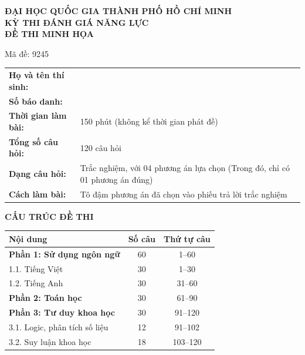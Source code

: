 \documentclass[12pt,a4paper]{article}
\begin{document}
\sloppy

\begin{center}
{\bfseries ĐẠI HỌC QUỐC GIA THÀNH PHỐ HỒ CHÍ MINH}\\[0.1cm]
{\bfseries KỲ THI ĐÁNH GIÁ NĂNG LỰC}\\[0.1cm]
{\bfseries ĐỀ THI MINH HỌA}
\end{center}
\hfill{\small Mã đề: 9245}

\noindent\begin{tabular}{@{}p{}p{}@{}}
\textbf{Họ và tên thí sinh:} & \dotfill \\
\textbf{Số báo danh:} & \dotfill \\
\textbf{Thời gian làm bài:} & 150 phút (không kể thời gian phát đề) \\
\textbf{Tổng số câu hỏi:} & 120 câu hỏi \\
\textbf{Dạng câu hỏi:} & Trắc nghiệm, với 04 phương án lựa chọn (Trong đó, chỉ có 01 phương án đúng) \\
\textbf{Cách làm bài:} & Tô đậm phương án đã chọn vào phiếu trả lời trắc nghiệm \\
\end{tabular}

\begin{center}\textbf{CẤU TRÚC ĐỀ THI}\\[0.1cm]
\begin{tabular}{|p{}|c|c|}\hline
\textbf{Nội dung} & \textbf{Số câu} & \textbf{Thứ tự câu} \\ \hline
\textbf{Phần 1: Sử dụng ngôn ngữ} & 60 & 1–60 \\ \hline
\hspace{0.5cm}1.1. Tiếng Việt & 30 & 1–30 \\ \hline
\hspace{0.5cm}1.2. Tiếng Anh & 30 & 31–60 \\ \hline
\textbf{Phần 2: Toán học} & 30 & 61–90 \\ \hline
\textbf{Phần 3: Tư duy khoa học} & 30 & 91–120 \\ \hline
\hspace{0.5cm}3.1. Logic, phân tích số liệu & 12 & 91–102 \\ \hline
\hspace{0.5cm}3.2. Suy luận khoa học & 18 & 103–120 \\ \hline
\end{tabular}\end{center}
\vspace{0.4cm}
\end{document}
